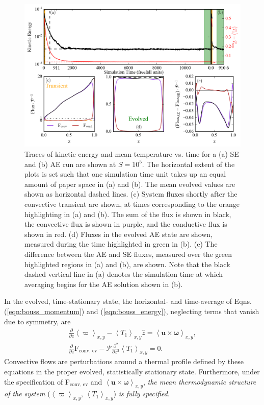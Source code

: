 \documentclass[aps, pre, onecolumn, nofootinbib, notitlepage, groupedaddress, amsfonts, amssymb, amsmath, longbibliography]{revtex4-1}
\newcommand{\angles}[1]{\ensuremath{\left\langle #1 \right\rangle}}
\begin{document}
\begin{figure}[t]
\includegraphics[width=\textwidth]{./figs/time_trace.png}
\caption{Traces of kinetic energy and mean temperature vs. time for a (a) SE and (b)
AE run are shown at $S = 10^5$.
The horizontal extent of the plots is set
such that one simulation time unit takes up an equal amount of paper space in (a) and (b).
The mean evolved values are shown as horizontal dashed lines.
(c) System fluxes shortly after the convective transient are shown, at times corresponding
to the orange highlighting in (a) and (b).  The sum of the flux is shown in black,
the convective flux is shown in purple, and the conductive flux is shown in red.
(d) Fluxes in the evolved AE state are shown, measured during the time highlighted
in green in (b).  
(e) The difference between the AE and SE fluxes, measured over the green highlighted
regions in (a) and (b), are shown.
Note that the black dashed vertical line in (a) denotes the simulation time at which
averaging begins for the AE solution shown in (b).
\label{fig:time_trace} }
\end{figure}



In the evolved, time-stationary state, the horizontal- and time-average of
Eqns. (\ref{eqn:bouss_momentum}) and (\ref{eqn:bouss_energy}), neglecting terms that
vanish due to symmetry, are
\begin{gather}
\frac{\partial}{\partial z}\angles{\varpi}_{x,y} - \angles{T_1}_{x,y}\hat{z} = \angles{\bm{u}\times\bm{\omega}}_{x,y},
	\label{eqn:bouss_BVP_momentum}
\\
\frac{\partial}{\partial z}\text{F}_{\text{conv, ev}} - \mathcal{P}\frac{\partial^2}{\partial z^2} \angles{T_1}_{x,y} = 0.
	\label{eqn:bouss_BVP_energy}
\end{gather}
Convective flows
are perturbations around a thermal profile defined by these equations in the proper evolved, 
statistically stationary state. Furthermore, under the specification of
F$_{\text{conv, ev}}$ and $\angles{\bm{u}\times\bm{\omega}}_{x,y}$,
\emph{the mean thermodynamic structure of the system} ($\angles{\varpi}_{x,y},\,\angles{T_1}_{x,y}$)
\emph{is fully specified}.
\end{document}
